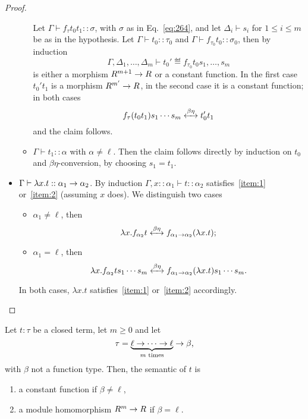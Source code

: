 \begin{proof}
\begin{itemize}
\begin{itemize}
      Let $\Gamma\vdash f_\tau t_0t_1::\sigma$, with $\sigma$ as in
      Eq.~\eqref{eq:264}, and let $\Delta_i\vdash s_i$ for $1\le i\le
      m$ be as in the hypothesis.  Let $\Gamma\vdash t_0::\tau_0$ and
      $\Gamma\vdash f_{\tau_0}t_0::\sigma_0$, then by induction
      \begin{equation}
        \label{eq:271}
        \Gamma,\Delta_1,\ldots,\Delta_m\vdash t_0'\eqdef f_{\tau_0}t_0s_1,\ldots,s_m
      \end{equation}
      is either a morphism $R^{m+1}\rightarrow R$ or a constant function. In
      the first case $t_0't_1$ is a morphism $R^{m'}\rightarrow R$, in the second
      case it is a constant function; in both cases
      \begin{equation}
        \label{eq:74}
        f_\tau(t_0t_1)s_1\cdots s_m\xleftrightarrow{\beta\eta}t_0't_1        
      \end{equation}
      and the claim follows.
    \item $\Gamma\vdash t_1::\alpha$ with $\alpha\ne\ell$. Then the
      claim follows directly by induction on $t_0$ and
      $\beta\eta$-conversion, by choosing $s_1=t_1$.
    \end{itemize}
  \item $\Gamma\vdash \lambda x.t::\alpha_1\rightarrow\alpha_2$. By induction
    $\Gamma,x::\alpha_1\vdash t::\alpha_2$ satisfies~\ref{item:1}
    or~\ref{item:2} (assuming $x$ does). We distinguish two cases
    \begin{itemize}
    \item $\alpha_1\ne\ell$, then
      \begin{equation}
        \label{eq:73}
        \lambda x.f_{\alpha_2}t\xleftrightarrow{\beta\eta}f_{\alpha_1\rightarrow\alpha_2}(\lambda x.t)
        \text{;}
      \end{equation}
    \item $\alpha_1=\ell$, then
      \begin{equation}
        \label{eq:76}
        \lambda x.f_{\alpha_2}ts_1\cdots s_m\xleftrightarrow{\beta\eta}
        f_{\alpha_1\rightarrow\alpha_2}(\lambda x.t)s_1\cdots s_m
        \text{.}
      \end{equation}
    \end{itemize}
    In both cases, $\lambda x.t$ satisfies~\ref{item:1}
    or~\ref{item:2} accordingly.
  \end{itemize}
\end{proof}

\begin{proposition}
  Let $t:\tau$ be a closed term, let $m\ge0$ and let
  \begin{equation}
    \tau=\underbrace{\ell\rightarrow\cdots\rightarrow\ell}_{\text{$m$ times}}\rightarrow\beta
    \text{,}    
  \end{equation}
  with $\beta$ not a function type. Then, the semantic of $t$ is
  \begin{enumerate}
  \item a constant function if $\beta\ne\ell$,
  \item a module homomorphism $R^m\rightarrow R$ if $\beta=\ell$.
  \end{enumerate}
\end{proposition}

